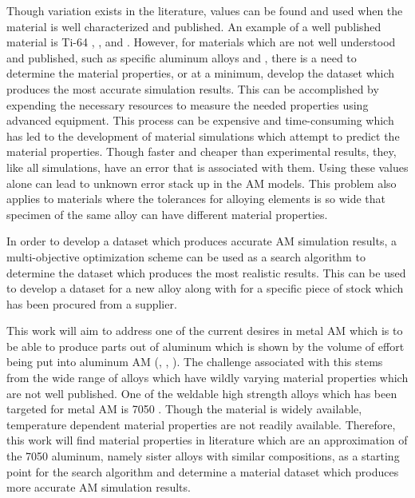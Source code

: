Though variation exists in the literature, values can be found and used when the material is well characterized and published.  An example of a well published material is Ti-64 \cite{welschgerhard_1993}, \cite{boivineau_2006}, and  \cite{fan_2012}.  However, for materials which are not well understood and published, such as specific aluminum alloys \cite{lundberg_material_1994} and \cite{lundberg_material_1994}, there is a need to determine the material properties, or at a minimum, develop the dataset which produces the most accurate simulation results. 
This can be accomplished by expending the necessary resources to measure the needed properties using advanced equipment.
This process can be expensive and time-consuming which has led to the development of material simulations which attempt to predict the material properties.  Though faster and cheaper than experimental results, they, like all simulations, have an error that is associated with them.  Using these values alone can lead to unknown error stack up in the \ac{AM} models.
This problem also applies to materials where the tolerances for alloying elements is so wide that specimen of the same alloy can have different material properties.  

In order to develop a dataset which produces accurate \ac{AM} simulation results, a multi-objective optimization scheme can be used as a search algorithm to determine the dataset which produces the most realistic results.  This can be used to develop a dataset for a new alloy along with for a specific piece of stock which has been procured from a supplier.

This work will aim to address one of the current desires in metal \ac{AM} which is to be able to produce parts out of aluminum which is shown by the volume of effort being put into aluminum \ac{AM} (\cite{qiHighStrengthLi2020}, \cite{weissImprovedHighTemperatureAluminum2019}, \cite{weissDevelopmentsAluminumScandiumCeramicAluminumScandiumCerium2019}).  The challenge associated with this stems from the wide range of alloys which have wildly varying material properties which are not well published.  One of the weldable high strength alloys which has been targeted for metal \ac{AM} is 7050 \cite{singhAdditiveManufacturing4047}.  Though the material is widely available, temperature dependent material properties are not readily available.  Therefore, this work will find material properties in literature which are an approximation of the 7050 aluminum, namely sister alloys with similar compositions, as a starting point for the search algorithm and determine a material dataset which produces more accurate \ac{AM} simulation results. 


